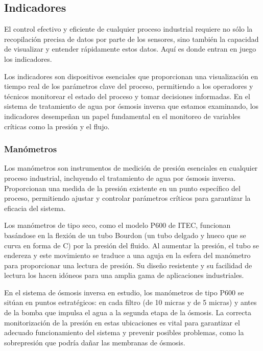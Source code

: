 
\subsection{Indicadores}

El control efectivo y eficiente de cualquier proceso industrial requiere no sólo la recopilación precisa de datos por parte de los sensores, sino también la capacidad de visualizar y entender rápidamente estos datos. Aquí es donde entran en juego los indicadores.

Los indicadores son dispositivos esenciales que proporcionan una visualización en tiempo real de los parámetros clave del proceso, permitiendo a los operadores y técnicos monitorear el estado del proceso y tomar decisiones informadas. En el sistema de tratamiento de agua por ósmosis inversa que estamos examinando, los indicadores desempeñan un papel fundamental en el monitoreo de variables críticas como la presión y el flujo.

\subsubsection{Manómetros} \label{sec:indicador_manometro}

Los manómetros son instrumentos de medición de presión esenciales en cualquier proceso industrial, incluyendo el tratamiento de agua por ósmosis inversa. Proporcionan una medida de la presión existente en un punto específico del proceso, permitiendo ajustar y controlar parámetros críticos para garantizar la eficacia del sistema.

Los manómetros de tipo seco, como el modelo P600 de ITEC, funcionan basándose en la flexión de un tubo Bourdon (un tubo delgado y hueco que se curva en forma de C) por la presión del fluido. Al aumentar la presión, el tubo se endereza y este movimiento se traduce a una aguja en la esfera del manómetro para proporcionar una lectura de presión. Su diseño resistente y su facilidad de lectura los hacen idóneos para una amplia gama de aplicaciones industriales.

En el sistema de ósmosis inversa en estudio, los manómetros de tipo P600 se sitúan en puntos estratégicos: en cada filtro (de 10 micras y de 5 micras) y antes de la bomba que impulsa el agua a la segunda etapa de la ósmosis. La correcta monitorización de la presión en estas ubicaciones es vital para garantizar el adecuado funcionamiento del sistema y prevenir posibles problemas, como la sobrepresión que podría dañar las membranas de ósmosis.


